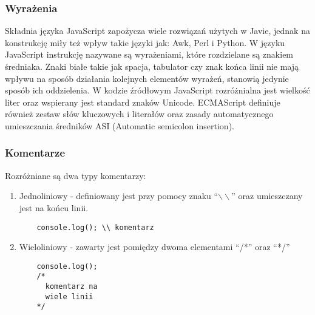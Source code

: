 \documentclass[a4paper]{article}
\begin{document}

\subsubsection{Wyrażenia}

\par Składnia języka JavaScript zapożycza wiele rozwiązań użytych w Javie, jednak na konstrukcję miły też wpływ takie języki jak: Awk, Perl i Python. W języku JavaScript instrukcję nazywane są wyrażeniami, które rozdzielane są znakiem średniaka. Znaki białe takie jak spacja, tabulator czy znak końca linii nie mają wpływu na sposób działania kolejnych elementów wyrażeń, stanowią jedynie sposób ich oddzielenia. W kodzie źródłowym JavaScript rozróżnialna jest wielkość liter oraz wspierany jest standard znaków Unicode. ECMAScript definiuje również zestaw słów kluczowych i literałów oraz zasady automatycznego umieszczania średników ASI (Automatic semicolon insertion).

\subsubsection{Komentarze}

\par Rozróżniane są dwa typy komentarzy:
\begin{enumerate}
  \item Jednoliniowy - definiowany jest przy pomocy znaku \enquote{$\backslash\backslash$} oraz umieszczany jest na końcu linii.
  \begin{lstlisting}
    console.log(); \\ komentarz
  \end{lstlisting}
  \item Wieloliniowy - zawarty jest pomiędzy dwoma elementami \enquote{/*} oraz \enquote{*/}
  \begin{lstlisting}
    console.log();
    /*
      komentarz na
      wiele linii
    */
  \end{lstlisting}
\end{enumerate}
\end{document}
